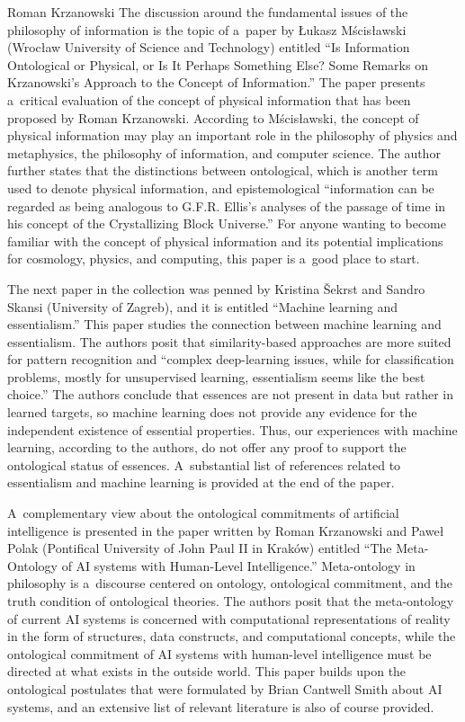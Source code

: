 \begin{editorialeng}{Roman Krzanowski}
The discussion around the fundamental issues of the philosophy of information is the topic of a~paper by Łukasz Mścisławski (Wrocław University of Science and Technology) entitled ``Is Information Ontological or Physical, or Is It Perhaps Something Else? Some Remarks on Krzanowski's Approach to the Concept of Information.'' The paper presents a~critical evaluation of the concept of physical information that has been proposed by Roman Krzanowski. According to Mścisławski, the concept of physical information may play an important role in the philosophy of physics and metaphysics, the philosophy of information, and computer science. The author further states that the distinctions between ontological, which is another term used to denote physical information, and epistemological ``information can be regarded as being analogous to G.F.R. Ellis's analyses of the passage of time in his concept of the Crystallizing Block Universe.'' For anyone wanting to become familiar with the concept of physical information and its potential implications for cosmology, physics, and computing, this paper is a~good place to start.

The next paper in the collection was penned by Kristina Šekrst and Sandro Skansi (University of Zagreb), and it is entitled ``Machine learning and essentialism.'' This paper studies the connection between machine learning and essentialism. The authors posit that similarity-based approaches are more suited for pattern recognition and ``complex deep-learning issues, while for classification problems, mostly for unsupervised learning, essentialism seems like the best choice.'' The authors conclude that essences are not present in data but rather in learned targets, so machine learning does not provide any evidence for the independent existence of essential properties. Thus, our experiences with machine learning, according to the authors, do not offer any proof to support the ontological status of essences. A~substantial list of references related to essentialism and machine learning is provided at the end of the paper.

A~complementary view about the ontological commitments of artificial intelligence is presented in the paper written by Roman Krzanowski and Paweł Polak (Pontifical University of John Paul II in Kraków) entitled ``The Meta-Ontology of AI systems with Human-Level Intelligence.'' Meta-ontology in philosophy is a~discourse centered on ontology, ontological commitment, and the truth condition of ontological theories. The authors posit that the meta-ontology of current AI systems is concerned with computational representations of reality in the form of structures, data constructs, and computational concepts, while the ontological commitment of AI systems with human-level intelligence must be directed at what exists in the outside world. This paper builds upon the ontological postulates that were formulated by Brian Cantwell Smith about AI systems, and an extensive list of relevant literature is also of course provided.


\end{editorialeng}
